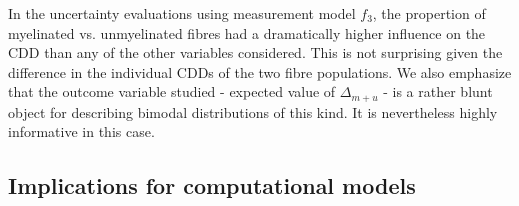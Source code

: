 In the uncertainty evaluations using measurement model $f_3$, the propertion of myelinated vs. unmyelinated fibres had a dramatically higher influence on the CDD than any of the other variables considered. This is not surprising given the difference in the individual CDDs of the two fibre populations. We also emphasize that the outcome variable studied - expected value of $\Delta_{m+u}$ - is a rather blunt object for describing bimodal distributions of this kind. It is nevertheless highly informative in this case. 


\subsection{Implications for computational models}


